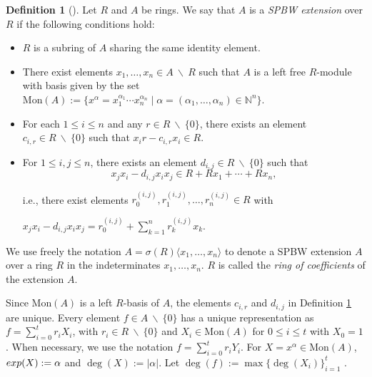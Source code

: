 \documentclass{amsart}
\theoremstyle{definition}
\newtheorem{definition}[theorem]{Definition}
\theoremstyle{remark}
\numberwithin{equation}{section}
\begin{document}
\begin{definition}[{\cite[Definition 1]{GallegoLezama2010}}]\label{defpbwextension} 
Let $R$ and $A$ be rings. We say that $A$ is a {\it SPBW extension} over $R$ if the following conditions hold:
\begin{itemize}
\item [(i)] $R$ is a subring of $A$ sharing the same identity element.

\item [(ii)] There exist elements $x_1, \ldots, x_n \in A\ \backslash\ R$ such that $A$ is a left free $R$-module with basis given by the set $\text{Mon}(A):= \{ x^{\alpha} = x_{1}^{\alpha_1} \cdots x_{n}^{\alpha_n}\mid \alpha =(\alpha_1, \ldots, \alpha_n) \in \mathbb{N}^n\}$.

\item[(iii)] For each $1 \leq i \leq n$ and any $r \in R\  \backslash\ \{0\}$, there exists an element $c_{i,r} \in R \ \backslash\ \{0\}$ such that $x_ir - c_{i,r}x_i \in R$.

\item[\rm (iv)]For $1\leq i, j\leq n$, there exists an element $d_{i,j}\in R\ \backslash\ \{0\}$ such that
\[
x_jx_i-d_{i,j}x_ix_j\in R+Rx_1+\cdots +Rx_n,
\]

i.e., there exist elements $r_0^{(i,j)}, r_1^{(i,j)}, \dotsc, r_n^{(i,j)} \in R$ with
\begin{center}\label{relSPBW}
$x_jx_i - d_{i,j}x_ix_j = r_0^{(i,j)} + \sum_{k=1}^{n} r_k^{(i,j)}x_k$.    
\end{center}
\end{itemize}
\end{definition}

We use freely the notation $A = \sigma(R)\langle x_1,\dotsc, x_n\rangle$ to denote a SPBW extension $A$ over a ring $R$ in the indeterminates $x_1, \dotsc, x_n$. $R$ is called the {\em ring of coefficients} of the extension $A$. 

Since $\text{Mon}(A)$ is a left $R$-basis of $A$, the elements $c_{i,r}$ and $d_{i,j}$ in Definition \ref{defpbwextension} are unique. Every element $f \in A\  \backslash\ \{0\}$ has a unique representation as $f = \sum_{i=0}^tr_iX_i$, with $r_i \in R\ \backslash\ \{0\}$ and $X_i \in \text{Mon}(A)$ for $0 \leq i \leq t$ with $X_0=1$. When necessary, we use the notation $f = \sum_{i=0}^tr_iY_i$. For $X=x^{\alpha}\in\text{Mon}(A)$, ${\rm exp}(X):=\alpha$ and $\deg(X):=|\alpha|$. Let $\deg(f):=\max\{\deg(X_i)\}_{i=1}^t$ \cite[Remark 2 and Definition 6]{GallegoLezama2010}. 
\end{document}
